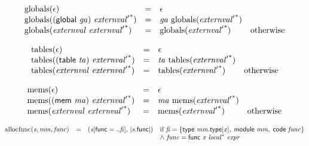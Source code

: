 $$
\begin{array}{@{}lcl@{}l@{}}
{\mathrm{globals}}(\epsilon) &=& \epsilon &  \\
{\mathrm{globals}}((\mathsf{global}~{\mathit{ga}})~{{\mathit{externval}'}^\ast}) &=& {\mathit{ga}}~{\mathrm{globals}}({{\mathit{externval}'}^\ast}) &  \\
{\mathrm{globals}}({\mathit{externval}}~{{\mathit{externval}'}^\ast}) &=& {\mathrm{globals}}({{\mathit{externval}'}^\ast}) &\quad
  \mbox{otherwise} \\
\end{array}
$$

$$
\begin{array}{@{}lcl@{}l@{}}
{\mathrm{tables}}(\epsilon) &=& \epsilon &  \\
{\mathrm{tables}}((\mathsf{table}~{\mathit{ta}})~{{\mathit{externval}'}^\ast}) &=& {\mathit{ta}}~{\mathrm{tables}}({{\mathit{externval}'}^\ast}) &  \\
{\mathrm{tables}}({\mathit{externval}}~{{\mathit{externval}'}^\ast}) &=& {\mathrm{tables}}({{\mathit{externval}'}^\ast}) &\quad
  \mbox{otherwise} \\
\end{array}
$$

$$
\begin{array}{@{}lcl@{}l@{}}
{\mathrm{mems}}(\epsilon) &=& \epsilon &  \\
{\mathrm{mems}}((\mathsf{mem}~{\mathit{ma}})~{{\mathit{externval}'}^\ast}) &=& {\mathit{ma}}~{\mathrm{mems}}({{\mathit{externval}'}^\ast}) &  \\
{\mathrm{mems}}({\mathit{externval}}~{{\mathit{externval}'}^\ast}) &=& {\mathrm{mems}}({{\mathit{externval}'}^\ast}) &\quad
  \mbox{otherwise} \\
\end{array}
$$

\vspace{1ex}

\vspace{1ex}

$$
\begin{array}{@{}lcl@{}l@{}}
{\mathrm{allocfunc}}({\mathit{s}}, {\mathit{mm}}, {\mathit{func}}) &=& ({\mathit{s}}{}[\mathsf{func} = ..{\mathit{fi}}],\, {|{\mathit{s}}.\mathsf{func}|}) &\quad
  \mbox{if}~{\mathit{fi}} = \{ \begin{array}[t]{@{}l@{}}
\mathsf{type}~{\mathit{mm}}.\mathsf{type}{}[{\mathit{x}}],\; \mathsf{module}~{\mathit{mm}},\; \mathsf{code}~{\mathit{func}} \}\end{array} \\
 &&&\quad {\land}~{\mathit{func}} = \mathsf{func}~{\mathit{x}}~{{\mathit{local}}^\ast}~{\mathit{expr}} \\
\end{array}
$$

